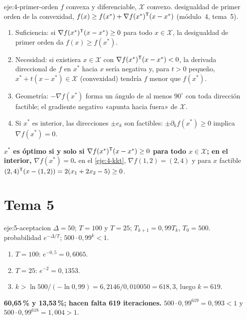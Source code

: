 \begin{solucion}{eje:4-primer-orden}
\datos $f$ convexa y diferenciable, $\mathcal{X}$ convexo.
\planteamiento desigualdad de primer orden de la convexidad, $f(x)\ge f(x^{*})+\nabla f(x^{*})^{\mathsf{T}}(x-x^{*})$ (módulo~4, tema~5).
\pasos
\begin{enumerate}[label=\arabic*.]
  \item Suficiencia: si $\nabla f(x^{*})^{\mathsf{T}}(x-x^{*})\ge 0$ para todo $x\in\mathcal{X}$, la desigualdad de primer orden da $f(x)\ge f(x^{*})$.
  \item Necesidad: si existiera $x\in\mathcal{X}$ con $\nabla f(x^{*})^{\mathsf{T}}(x-x^{*})<0$, la derivada direccional de $f$ en $x^{*}$ hacia $x$ sería negativa y, para $t>0$ pequeño, $x^{*}+t(x-x^{*})\in\mathcal{X}$ (convexidad) tendría $f$ menor que $f(x^{*})$.
  \item Geometría: $-\nabla f(x^{*})$ forma un ángulo de al menos $90^{\circ}$ con toda dirección factible; el gradiente negativo «apunta hacia fuera» de $\mathcal{X}$.
  \item Si $x^{*}$ es interior, las direcciones $\pm e_k$ son factibles: $\pm\partial_kf(x^{*})\ge 0$ implica $\nabla f(x^{*})=0$.
\end{enumerate}
\resultado \textbf{$x^{*}$ es óptimo si y solo si $\nabla f(x^{*})^{\mathsf{T}}(x-x^{*})\ge 0$ para todo $x\in\mathcal{X}$; en el interior, $\nabla f(x^{*})=0$.}
\comprobacion en el \cref{eje:4-kkt}, $\nabla f(1,2)=(2,4)$ y para $x$ factible $(2,4)^{\mathsf{T}}(x-(1,2))=2(x_1+2x_2-5)\ge 0$.
\end{solucion}

\section{Tema 5}

\begin{solucion}{eje:5-aceptacion}
\datos $\Delta=50$; $T=100$ y $T=25$; $T_{k+1}=0{,}99T_k$, $T_0=500$.
\planteamiento probabilidad $e^{-\Delta/T}$; $500\cdot 0{,}99^{k}<1$.
\pasos
\begin{enumerate}[label=\arabic*.]
  \item $T=100$: $e^{-0{,}5}=0{,}6065$.
  \item $T=25$: $e^{-2}=0{,}1353$.
  \item $k>\ln 500/(-\ln 0{,}99)=6{,}2146/0{,}010050=618{,}3$, luego $k=619$.
\end{enumerate}
\resultado \textbf{60,65\,\% y 13,53\,\%; hacen falta 619 iteraciones.}
\comprobacion $500\cdot 0{,}99^{619}=0{,}993<1$ y $500\cdot 0{,}99^{618}=1{,}004>1$.
\end{solucion}


